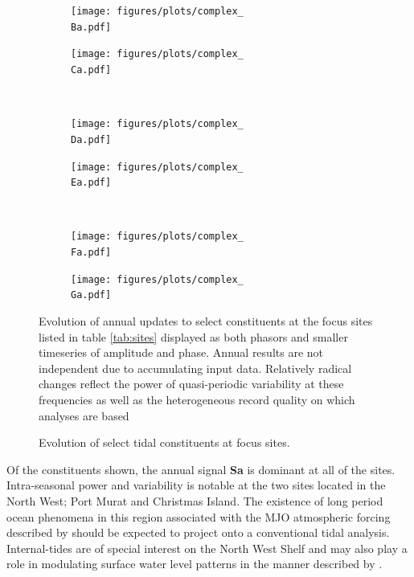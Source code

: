 
\begin{figure}[h]\centering
    \begin{subfigure}[b]{\figwidthHalf}
        \texttt{[image: figures/plots/complex\_\\Ba.pdf]}\caption{\Bname{}}
    \end{subfigure}
    \begin{subfigure}[b]{\figwidthHalf}
        \texttt{[image: figures/plots/complex\_\\Ca.pdf]}\caption{\Cname{}}
    \end{subfigure} 
    \\
    \begin{subfigure}[b]{\figwidthHalf}
        \texttt{[image: figures/plots/complex\_\\Da.pdf]}\caption{\Dname{}}
    \end{subfigure}
    \begin{subfigure}[b]{\figwidthHalf}
        \texttt{[image: figures/plots/complex\_\\Ea.pdf]}\caption{\Ename{}}
    \end{subfigure}
    \\
    \begin{subfigure}[b]{\figwidthHalf}
        \texttt{[image: figures/plots/complex\_\\Fa.pdf]} \caption{\Fname{}}
    \end{subfigure}
    \begin{subfigure}[b]{\figwidthHalf}
        \texttt{[image: figures/plots/complex\_\\Ga.pdf]} \caption{\Gname{}}
    \end{subfigure}
    \caption{Evolution of select tidal constituents at focus sites.}
    {Evolution of annual updates to select constituents at the focus sites listed in table \ref{tab:sites} displayed as both phasors and smaller timeseries of amplitude and phase.  Annual results are not independent due to accumulating input data. Relatively radical changes reflect the power of quasi-periodic variability at these frequencies as well as the heterogeneous record quality on which analyses are based} 
    \label{fig:complexEvolution}
\end{figure}   

Of the constituents shown, the annual signal \textbf{Sa} is dominant at all of the sites.
Intra-seasonal power and variability is notable at the two sites located in the North West; Port Murat and Christmas Island.   The existence of long period ocean phenomena in this region associated with the MJO atmospheric forcing described by \citeauthor{Maxime:2019jc} should be expected to project onto a conventional tidal analysis.   Internal-tides are of special interest on the North West Shelf \citep{10.3389/fmars.2021.629372} and may also play a role in  modulating surface water level patterns in the manner described by \citeauthor{Colosi:2006va}.

